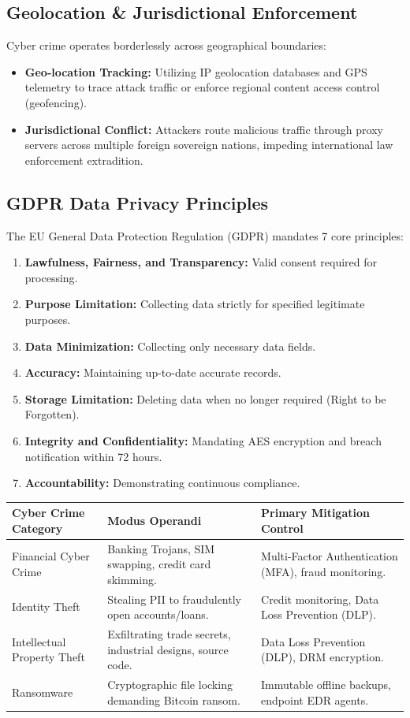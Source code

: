 \documentclass[12pt,a4paper]{article}
\renewcommand{\arraystretch}{1.45}
\begin{document}
\subsection{Geolocation \& Jurisdictional Enforcement}
Cyber crime operates borderlessly across geographical boundaries:
\begin{itemize}[leftmargin=*, itemsep=3pt]
  \item \textbf{Geo-location Tracking:} Utilizing IP geolocation databases and GPS telemetry to trace attack traffic or enforce regional content access control (geofencing).
  \item \textbf{Jurisdictional Conflict:} Attackers route malicious traffic through proxy servers across multiple foreign sovereign nations, impeding international law enforcement extradition.
\end{itemize}

\subsection{GDPR Data Privacy Principles}
The EU General Data Protection Regulation (GDPR) mandates 7 core principles:
\begin{enumerate}[leftmargin=*, itemsep=3pt]
  \item \textbf{Lawfulness, Fairness, and Transparency:} Valid consent required for processing.
  \item \textbf{Purpose Limitation:} Collecting data strictly for specified legitimate purposes.
  \item \textbf{Data Minimization:} Collecting only necessary data fields.
  \item \textbf{Accuracy:} Maintaining up-to-date accurate records.
  \item \textbf{Storage Limitation:} Deleting data when no longer required (Right to be Forgotten).
  \item \textbf{Integrity and Confidentiality:} Mandating AES encryption and breach notification within 72 hours.
  \item \textbf{Accountability:} Demonstrating continuous compliance.
\end{enumerate}

{\renewcommand{\arraystretch}{1.45}%
\begin{tabularx}{\linewidth}{|B{3.5cm}|Y|Y|}
\hline
\textbf{Cyber Crime Category} & \textbf{Modus Operandi} & \textbf{Primary Mitigation Control} \\
\hline
Financial Cyber Crime & Banking Trojans, SIM swapping, credit card skimming. & Multi-Factor Authentication (MFA), fraud monitoring. \\
\hline
Identity Theft & Stealing PII to fraudulently open accounts/loans. & Credit monitoring, Data Loss Prevention (DLP). \\
\hline
Intellectual Property Theft & Exfiltrating trade secrets, industrial designs, source code. & Data Loss Prevention (DLP), DRM encryption. \\
\hline
Ransomware & Cryptographic file locking demanding Bitcoin ransom. & Immutable offline backups, endpoint EDR agents. \\
\hline
\end{tabularx}}
\end{document}
